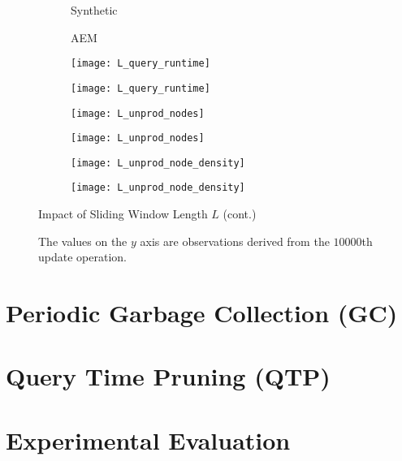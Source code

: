 \documentclass[abstracton,12pt]{scrartcl}
\theoremstyle{definition}
\begin{document}
\begin{figure}[h]\ContinuedFloat
  \centering
  \begin{subfigure}{0.49\linewidth}
    \centering
    Synthetic
  \end{subfigure}
  \begin{subfigure}{0.49\linewidth}
    \centering
    AEM
  \end{subfigure}
  \begin{subfigure}{0.49\linewidth}
    \centering
    \texttt{[image: L\_query\_runtime]}
    \caption{}
    \label{fig:L_query_runtime_synthetic}
  \end{subfigure}
  \begin{subfigure}{0.49\linewidth}
    \centering
    \texttt{[image: L\_query\_runtime]}
    \caption{}
    \label{fig:L_query_runtime_aem}
  \end{subfigure}
  \begin{subfigure}{0.49\linewidth}
    \centering
    \texttt{[image: L\_unprod\_nodes]}
    \caption{}
    \label{fig:L_unprod_nodes_synthetic}
  \end{subfigure}
  \begin{subfigure}{0.49\linewidth}
    \centering
    \texttt{[image: L\_unprod\_nodes]}
    \caption{}
    \label{fig:L_unprod_nodes_aem}
  \end{subfigure}
  \begin{subfigure}{0.49\linewidth}
    \centering
    \texttt{[image: L\_unprod\_node\_density]}
    \caption{}
    \label{fig:L_unprod_node_density_synthetic}
  \end{subfigure}
  \begin{subfigure}{0.49\linewidth}
    \centering
    \texttt{[image: L\_unprod\_node\_density]}
    \caption{}
    \label{fig:L_unprod_node_density_aem}
  \end{subfigure}
  \caption{Impact of Sliding Window Length $L$ (cont.)}
  \caption*{\footnotesize The values on the $y$ axis are observations derived from the $10000$th
    update operation. }
  \label{fig:sliding_window_length}
\end{figure}

\section{Periodic Garbage Collection (GC)}

\section{Query Time Pruning (QTP)}

\section{Experimental Evaluation}






\newpage



\end{document}
